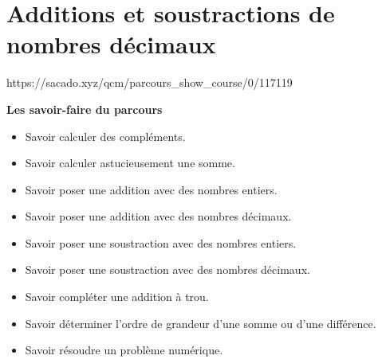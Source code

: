 \chapter{Additions et soustractions de nombres décimaux}
{https://sacado.xyz/qcm/parcours_show_course/0/117119}
{

\begin{CpsCol}
 \textbf{Les savoir-faire du parcours}
 \begin{itemize}
 \item Savoir calculer des compléments.
 \item Savoir calculer astucieusement une somme.
 \item Savoir poser une addition avec des nombres entiers.
 \item Savoir poser une addition avec des nombres décimaux.
 \item Savoir poser une soustraction avec des nombres entiers.
 \item Savoir poser une soustraction avec des nombres décimaux.
 \item Savoir compléter une addition à trou.
 \item Savoir déterminer l'ordre de grandeur d'une somme ou d'une différence.
 \item Savoir résoudre un problème numérique.
 \end{itemize}
\end{CpsCol}

}

